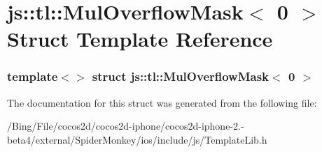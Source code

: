 \hypertarget{structjs_1_1tl_1_1_mul_overflow_mask_3_010_01_4}{\section{js\-:\-:tl\-:\-:Mul\-Overflow\-Mask$<$ 0 $>$ Struct Template Reference}
\label{structjs_1_1tl_1_1_mul_overflow_mask_3_010_01_4}
}
\subsubsection*{template$<$$>$ struct js\-::tl\-::\-Mul\-Overflow\-Mask$<$ 0 $>$}



The documentation for this struct was generated from the following file\-:\begin{DoxyCompactItemize}
\item 
/\-Bing/\-File/cocos2d/cocos2d-\/iphone/cocos2d-\/iphone-\/2.-\/beta4/external/\-Spider\-Monkey/ios/include/js/Template\-Lib.\-h\end{DoxyCompactItemize}
